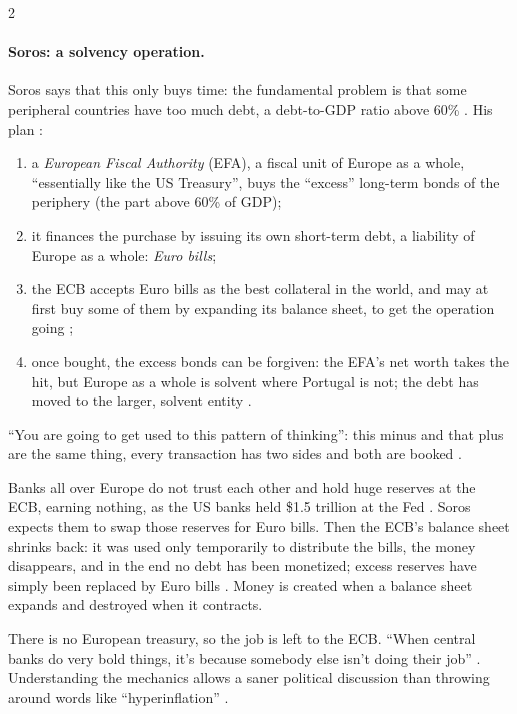 \begin{paracol}{2}
\paragraph{Soros: a solvency operation.} Soros says that this only buys time: the fundamental problem is that some
peripheral countries have too much debt, a debt-to-GDP ratio above 60\% . His plan
:
\begin{enumerate}
  \item a \emph{European Fiscal Authority} (EFA), a fiscal unit of Europe as a whole, ``essentially like the US
        Treasury'', buys the ``excess'' long-term bonds of the periphery (the part above 60\% of GDP);
  \item it finances the purchase by issuing its own short-term debt, a liability of Europe as a whole:
        \emph{Euro bills};
  \item the ECB accepts Euro bills as the best collateral in the world, and may at first buy some of them by
        expanding its balance sheet, to get the operation going ;
  \item once bought, the excess bonds can be forgiven: the EFA's net worth takes the hit, but Europe as a whole is
        solvent where Portugal is not; the debt has moved to the larger, solvent entity .
\end{enumerate}
\begin{taccts}
\quad
{}\quad
{}
\end{taccts}
``You are going to get used to this pattern of thinking'': this minus and that plus are the same thing, every
transaction has two sides and both are booked .

\begin{intuition}
Banks all over Europe do not trust each other and hold huge reserves at the ECB, earning nothing, as the US banks
held \$1.5 trillion at the Fed . Soros expects them to swap those reserves for Euro
bills. Then the ECB's balance sheet shrinks back: it was used only temporarily to distribute the bills, the money
disappears, and in the end no debt has been monetized; excess reserves have simply been replaced by Euro bills
. Money is created when a balance sheet expands and destroyed when it contracts.
\end{intuition}
\begin{taccts}
\qquad
{}
\end{taccts}
There is no European treasury, so the job is left to the ECB. ``When central banks do very bold things, it's because
somebody else isn't doing their job'' . Understanding the mechanics allows a saner
political discussion than throwing around words like ``hyperinflation'' .


\end{paracol}
